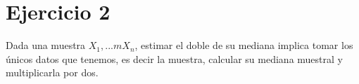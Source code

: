 \section{Ejercicio 2}
Dada una muestra $X_{1}, ...m X_{n}$, estimar el doble de su mediana implica tomar los únicos datos que tenemos, es decir la muestra, calcular su mediana muestral y multiplicarla por dos.